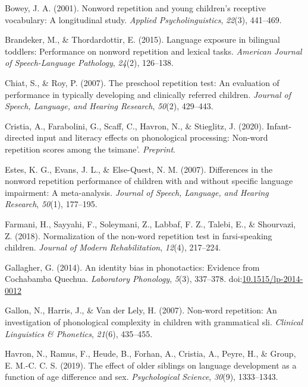\documentclass[english,,man,floatsintext]{apa6}
\begin{document}
\hypertarget{ref-bowey2001nonword}{}
Bowey, J. A. (2001). Nonword repetition and young children's receptive
vocabulary: A longitudinal study. \emph{Applied Psycholinguistics},
\emph{22}(3), 441--469.

\hypertarget{ref-brandeker2015language}{}
Brandeker, M., \& Thordardottir, E. (2015). Language exposure in
bilingual toddlers: Performance on nonword repetition and lexical tasks.
\emph{American Journal of Speech-Language Pathology}, \emph{24}(2),
126--138.

\hypertarget{ref-chiat2007preschool}{}
Chiat, S., \& Roy, P. (2007). The preschool repetition test: An
evaluation of performance in typically developing and clinically
referred children. \emph{Journal of Speech, Language, and Hearing
Research}, \emph{50}(2), 429--443.

\hypertarget{ref-cristia2020infant}{}
Cristia, A., Farabolini, G., Scaff, C., Havron, N., \& Stieglitz, J.
(2020). Infant-directed input and literacy effects on phonological
processing: Non-word repetition scores among the tsimane'.
\emph{Preprint}.

\hypertarget{ref-estes2007differences}{}
Estes, K. G., Evans, J. L., \& Else-Quest, N. M. (2007). Differences in
the nonword repetition performance of children with and without specific
language impairment: A meta-analysis. \emph{Journal of Speech, Language,
and Hearing Research}, \emph{50}(1), 177--195.

\hypertarget{ref-farmani2018normalization}{}
Farmani, H., Sayyahi, F., Soleymani, Z., Labbaf, F. Z., Talebi, E., \&
Shourvazi, Z. (2018). Normalization of the non-word repetition test in
farsi-speaking children. \emph{Journal of Modern Rehabilitation},
\emph{12}(4), 217--224.

\hypertarget{ref-gallagher2014identity}{}
Gallagher, G. (2014). An identity bias in phonotactics: Evidence from
Cochabamba Quechua. \emph{Laboratory Phonology}, \emph{5}(3), 337--378.
doi:\href{https://doi.org/10.1515/lp-2014-0012}{10.1515/lp-2014-0012}

\hypertarget{ref-gallon2007non}{}
Gallon, N., Harris, J., \& Van der Lely, H. (2007). Non-word repetition:
An investigation of phonological complexity in children with grammatical
sli. \emph{Clinical Linguistics \& Phonetics}, \emph{21}(6), 435--455.

\hypertarget{ref-havron2019effect}{}
Havron, N., Ramus, F., Heude, B., Forhan, A., Cristia, A., Peyre, H., \&
Group, E. M.-C. C. S. (2019). The effect of older siblings on language
development as a function of age difference and sex. \emph{Psychological
Science}, \emph{30}(9), 1333--1343.
\end{document}
